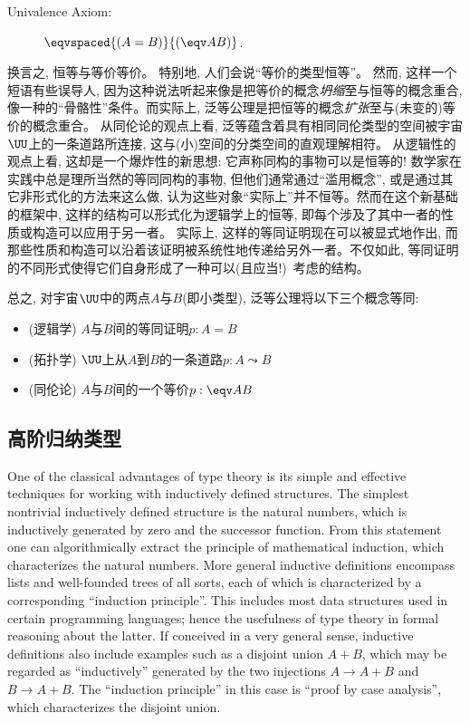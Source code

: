 \begin{description}%
\item[Univalence Axiom:]  $\eqvspaced{(A = B)}{(\eqv A B)}$.
\end{description}
%
换言之, 恒等与等价等价。
特别地, 人们会说``等价的类型恒等''。
然而, 这样一个短语有些误导人, 因为这种说法听起来像是把等价的概念\emph{坍缩}至与恒等的概念重合, 像一种的``骨骼性''条件。而实际上, 泛等公理是把恒等的概念\emph{扩张}至与(未变的)等价的概念重合。
从同伦论的观点上看, 泛等蕴含着具有相同同伦类型的空间被宇宙$\UU$上的一条道路所连接, 这与(小)空间的分类空间的直观理解相符。
从逻辑性的观点上看, 这却是一个爆炸性的新思想: 它声称同构的事物可以是恒等的! 数学家在实践中总是理所当然的等同同构的事物, 但他们通常通过``滥用概念'', 
或是通过其它非形式化的方法来这么做, 认为这些对象``实际上''并不恒等。然而在这个新基础的框架中, 这样的结构可以形式化为逻辑学上的恒等, 即每个涉及了其中一者的性质或构造可以应用于另一者。
实际上, 这样的等同证明现在可以被显式地作出, 而那些性质和构造可以沿着该证明被系统性地传递给另外一者。不仅如此, 等同证明的不同形式使得它们自身形成了一种可以(且应当!)\ 考虑的结构。

总之, 对宇宙$\UU$中的两点$A$与$B$(即小类型), 泛等公理将以下三个概念等同:
\begin{itemize}
\item (逻辑学) $A$与$B$间的等同证明$p:A=B$
\item (拓扑学) $\UU$上从$A$到$B$的一条道路$p:A \leadsto B$
\item (同伦论) $A$与$B$间的一个等价$p:\eqv A B$
\end{itemize}

\subsection*{高阶归纳类型}%

One of the classical advantages of type theory is its simple and effective techniques for working with inductively defined structures.
The simplest nontrivial inductively defined structure is the natural numbers, which is inductively generated by zero and the successor function.
From this statement one can algorithmically extract the principle of mathematical induction, which characterizes the natural numbers.
More general inductive definitions encompass lists and well-founded trees of all sorts, each of which is characterized by a corresponding ``induction principle''.
This includes most data structures used in certain programming languages; hence the usefulness of type theory in formal reasoning about the latter.
If conceived in a very general sense, inductive definitions also include examples such as a disjoint union $A+B$, which may be regarded as ``inductively'' generated by the two injections $A\to A+B$ and $B\to A+B$.
The ``induction principle'' in this case is ``proof by case analysis'', which characterizes the disjoint union.

